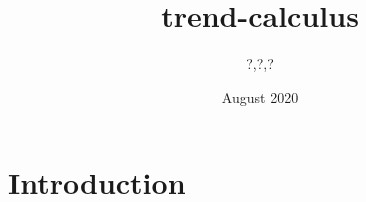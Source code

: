 \documentclass{article}
\title{trend-calculus}
\author{?,?,?}
\date{August 2020}
\begin{document}
\maketitle

\section{Introduction}
\end{document}

